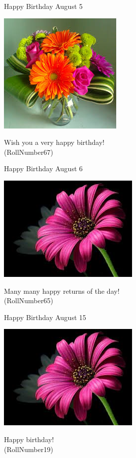 \documentclass[table, landscape]{beamer}
\begin{document}
\begin{frame}{\color{red}Happy Birthday }
{August 5}
\begin{center}
\includegraphics[height=0.5\textheight]{flowers/f8.jpeg}

Wish you a very happy birthday! \\ \vspace{0.5cm}{\Large name60} (RollNumber67)
\end{center}
\end{frame}
\begin{frame}{\color{blue}Happy Birthday }
{August 6}
\begin{center}
\includegraphics[height=0.5\textheight]{flowers/f2.jpeg}

Many many happy returns of the day! \\ \vspace{0.5cm}{\Large name58} (RollNumber65)
\end{center}
\end{frame}
\begin{frame}{\color{blue}Happy Birthday }
{August 15}
\begin{center}
\includegraphics[height=0.5\textheight]{flowers/f2.jpeg}

Happy birthday! \\ \vspace{0.5cm}{\Large name14} (RollNumber19)
\end{center}
\end{frame}
\end{document}
